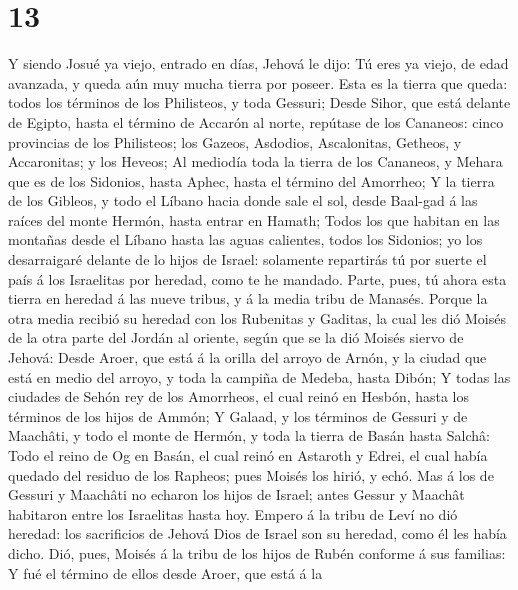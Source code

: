 \hypertarget{section-12}{%
\section{13}\label{section-12}}

 Y siendo Josué ya viejo, entrado en días, Jehová le dijo:
Tú eres ya viejo, de edad avanzada, y queda aún muy mucha tierra por
poseer.  Esta es la tierra que queda: todos los términos
de los Philisteos, y toda Gessuri;  Desde Sihor, que está
delante de Egipto, hasta el término de Accarón al norte, repútase de los
Cananeos: cinco provincias de los Philisteos; los Gazeos, Asdodios,
Ascalonitas, Getheos, y Accaronitas; y los Heveos;  Al
mediodía toda la tierra de los Cananeos, y Mehara que es de los
Sidonios, hasta Aphec, hasta el término del Amorrheo;  Y
la tierra de los Gibleos, y todo el Líbano hacia donde sale el sol,
desde Baal-gad á las raíces del monte Hermón, hasta entrar en Hamath;
 Todos los que habitan en las montañas desde el Líbano
hasta las aguas calientes, todos los Sidonios; yo los desarraigaré
delante de lo hijos de Israel: solamente repartirás tú por suerte el
país á los Israelitas por heredad, como te he mandado. 
Parte, pues, tú ahora esta tierra en heredad á las nueve tribus, y á la
media tribu de Manasés.  Porque la otra media recibió su
heredad con los Rubenitas y Gaditas, la cual les dió Moisés de la otra
parte del Jordán al oriente, según que se la dió Moisés siervo de
Jehová:  Desde Aroer, que está á la orilla del arroyo de
Arnón, y la ciudad que está en medio del arroyo, y toda la campiña de
Medeba, hasta Dibón;  Y todas las ciudades de Sehón rey
de los Amorrheos, el cual reinó en Hesbón, hasta los términos de los
hijos de Ammón;  Y Galaad, y los términos de Gessuri y de
Maachâti, y todo el monte de Hermón, y toda la tierra de Basán hasta
Salchâ:  Todo el reino de Og en Basán, el cual reinó en
Astaroth y Edrei, el cual había quedado del residuo de los Rapheos; pues
Moisés los hirió, y echó.  Mas á los de Gessuri y
Maachâti no echaron los hijos de Israel; antes Gessur y Maachât
habitaron entre los Israelitas hasta hoy.  Empero á la
tribu de Leví no dió heredad: los sacrificios de Jehová Dios de Israel
son su heredad, como él les había dicho.  Dió, pues,
Moisés á la tribu de los hijos de Rubén conforme á sus familias:
 Y fué el término de ellos desde Aroer, que está á la
